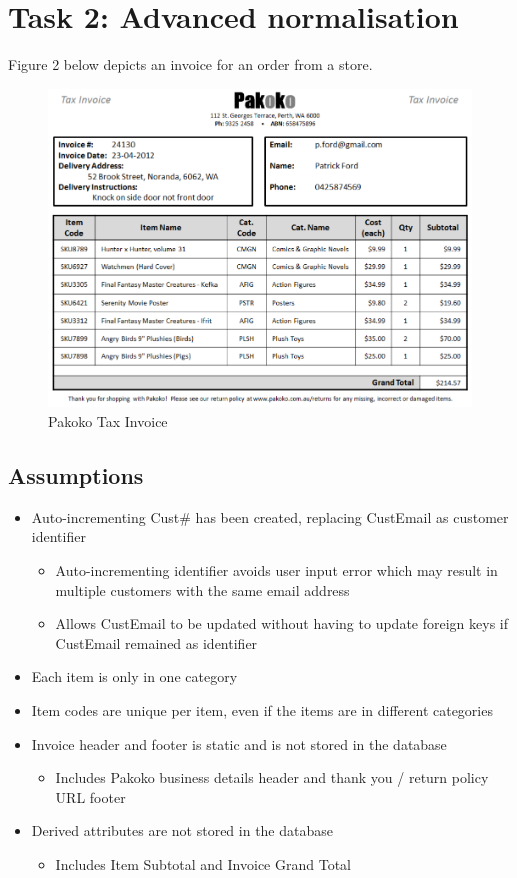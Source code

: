 \newpage
\section{Task 2: Advanced normalisation}

Figure 2 below depicts an invoice for an order from a store.

\begin{figure}[H]
\centering
\caption{Pakoko Tax Invoice}
\includegraphics[scale=0.75]{./img/task2.pdf}
\end{figure}

\subsection{Assumptions}

\begin{itemize}
\item Auto-incrementing Cust\# has been created, replacing CustEmail as customer identifier
	\begin{itemize}
	\item Auto-incrementing identifier avoids user input error which may result in multiple customers with the same email address
	\item Allows CustEmail to be updated without having to update foreign keys if CustEmail remained as identifier
	\end{itemize}
\item Each item is only in one category
\item Item codes are unique per item, even if the items are in different categories
\item Invoice header and footer is static and is not stored in the database
	\begin{itemize}
	\item Includes Pakoko business details header and thank you / return policy URL footer
	\end{itemize}
\item Derived attributes are not stored in the database
	\begin{itemize}
	\item Includes Item Subtotal and Invoice Grand Total
	\end{itemize}
\end{itemize}

